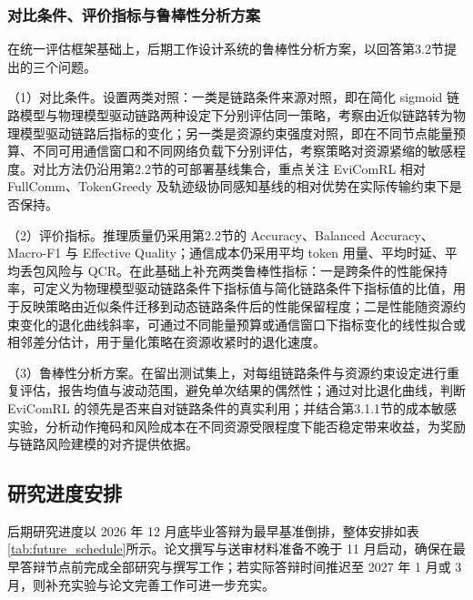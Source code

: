 \subsubsection{对比条件、评价指标与鲁棒性分析方案}
在统一评估框架基础上，后期工作设计系统的鲁棒性分析方案，以回答第3.2节提出的三个问题。

（1）对比条件。设置两类对照：一类是链路条件来源对照，即在简化 sigmoid 链路模型与物理模型驱动链路两种设定下分别评估同一策略，考察由近似链路转为物理模型驱动链路后指标的变化；另一类是资源约束强度对照，即在不同节点能量预算、不同可用通信窗口和不同网络负载下分别评估，考察策略对资源紧缩的敏感程度。对比方法仍沿用第2.2节的可部署基线集合，重点关注 EviComRL 相对 FullComm、TokenGreedy 及轨迹级协同感知基线的相对优势在实际传输约束下是否保持。

（2）评价指标。推理质量仍采用第2.2节的 Accuracy、Balanced Accuracy、Macro-F1 与 Effective Quality；通信成本仍采用平均 token 用量、平均时延、平均丢包风险与 QCR。在此基础上补充两类鲁棒性指标：一是跨条件的性能保持率，可定义为物理模型驱动链路条件下指标值与简化链路条件下指标值的比值，用于反映策略由近似条件迁移到动态链路条件后的性能保留程度；二是性能随资源约束变化的退化曲线斜率，可通过不同能量预算或通信窗口下指标变化的线性拟合或相邻差分估计，用于量化策略在资源收紧时的退化速度。

（3）鲁棒性分析方案。在留出测试集上，对每组链路条件与资源约束设定进行重复评估，报告均值与波动范围，避免单次结果的偶然性；通过对比退化曲线，判断 EviComRL 的领先是否来自对链路条件的真实利用；并结合第3.1.1节的成本敏感实验，分析动作掩码和风险成本在不同资源受限程度下能否稳定带来收益，为奖励与链路风险建模的对齐提供依据。

\subsection{研究进度安排}
后期研究进度以 2026 年 12 月底毕业答辩为最早基准倒排，整体安排如表\ref{tab:future_schedule}所示。论文撰写与送审材料准备不晚于 11 月启动，确保在最早答辩节点前完成全部研究与撰写工作；若实际答辩时间推迟至 2027 年 1 月或 3 月，则补充实验与论文完善工作可进一步充实。

